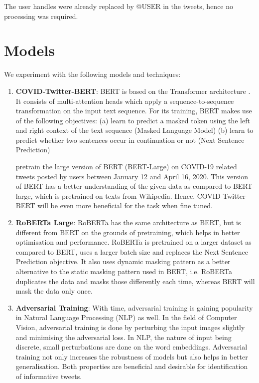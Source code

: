 \documentclass[11pt,a4paper]{article}
\begin{document}
The user handles were already replaced by @USER in the tweets, hence no processing was required.

\section{Models}
\label{sec:methods}

We experiment with the following models and techniques:

\begin{enumerate}

\item {\bf COVID-Twitter-BERT}: BERT is based on the Transformer architecture \cite{vaswani2017attention}. It consists of multi-attention heads which apply a sequence-to-sequence transformation on the input text sequence. 
For its training, BERT makes use of the following objectives:
(a) learn to predict a masked token using the left and right context of the text sequence (Masked Language Model)
(b) learn to predict whether two sentences occur in continuation or not (Next Sentence Prediction)

\citet{muller2020covid} pretrain the large version of BERT (BERT-Large) on COVID-19 related tweets posted by users between January 12 and April 16, 2020. This version of BERT has a better understanding of the given data as compared to BERT-large, which is pretrained on texts from Wikipedia. Hence, COVID-Twitter-BERT will be even more beneficial for the task when fine tuned.

\item {\bf RoBERTa Large}: RoBERTa has the same architecture as BERT, but is different from BERT on the grounds of pretraining, which helps in better optimisation and performance. RoBERTa is pretrained on a larger dataset as compared to BERT, uses a larger batch size and replaces the Next Sentence Prediction objective. It also uses dynamic masking pattern as a better alternative to the static masking pattern used in BERT, i.e. RoBERTa duplicates the data and masks those differently each time, whereas BERT will mask the data only once.

\item {\bf Adversarial Training}: With time, adversarial training is gaining popularity in Natural Language Processing (NLP) as well. In the field of Computer Vision, adversarial training is done by perturbing the input images slightly and minimising the adversarial loss. In NLP, the nature of input being discrete, small perturbations are done on the word embeddings. Adversarial training not only increases the robustness of models but also helps in better generalisation. Both properties are beneficial and desirable for identification of informative tweets.


\end{enumerate}
\end{document}
